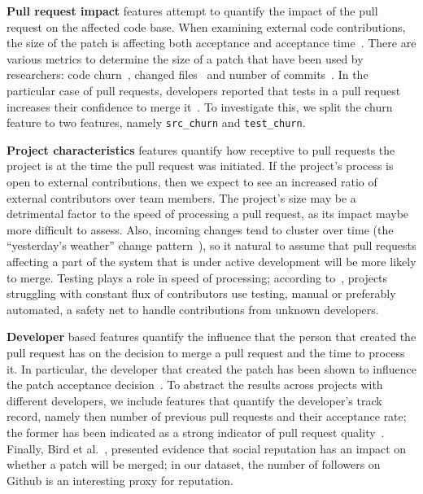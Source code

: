 \documentclass{acm_proc_article-sp}
\begin{document}

  \textbf{Pull request impact}
    features attempt to quantify the impact of the
    pull request on the affected code base. When examining external code
    contributions, the size of the patch is affecting both acceptance and
    acceptance time~\cite{Weiss08}. There are various metrics to determine the
    size of a patch that have been used by researchers: code
    churn~\cite{Nagap05, Ratzi07}, changed files~\cite{Nagap05} and number of
    commits~\cite{Fluri07}. In the particular case of pull requests, developers
    reported that tests in a pull request increases their confidence to merge
    it~\cite{Pham13}. To investigate this, we split the churn feature to two
    features, namely \texttt{src\_churn} and \texttt{test\_churn}.

  \textbf{Project characteristics}
    features quantify how receptive to pull
    requests the project is at the time the pull request was initiated.
    If the project's process is open to external contributions, then
    we expect to see an increased ratio of external contributors over
    team members. The project's size may be a detrimental
    factor to the speed of processing a pull request, as its impact maybe
    more difficult to assess.
    Also, incoming changes tend to cluster over time (the ``yesterday's
    weather'' change pattern~\cite{Girba04}), so it natural to assume
    that pull requests affecting a part of the system that is under
    active development will be more likely to merge.
    Testing plays a role in speed of processing; according
    to~\cite{Pham13}, projects struggling with constant flux of contributors 
    use testing, manual or preferably automated, a safety net to handle
    contributions from unknown developers.

  \textbf{Developer}  
    based features quantify the influence that the person that
    created the pull request has on the decision to merge a pull request and
    the time to process it. In particular, the developer that created the patch
    has been shown to influence the patch acceptance decision~\cite{Jeong09}. To
    abstract the results across projects with different developers, we
    include features that quantify the developer's track record, namely then
    number of previous pull requests and their acceptance rate; the former has
    been indicated as a strong indicator of pull request quality~\cite{Pham13}.
    Finally, Bird et al.~\cite{Bird07}, presented evidence that social
    reputation has an impact on whether a patch will be merged; in our dataset,
    the number of followers on Github is an interesting proxy for
    reputation.
\end{document}
